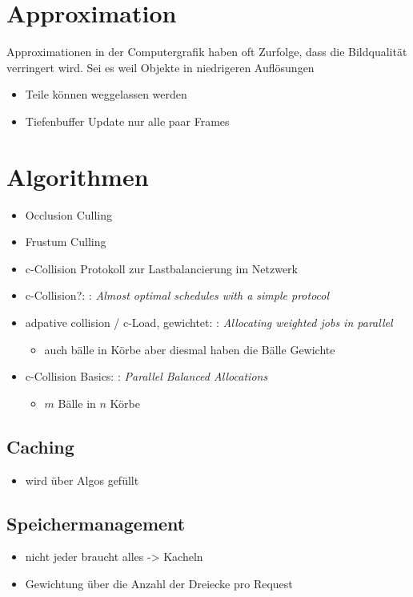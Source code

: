 \section{Approximation}
\label{basics:approximation}
Approximationen in der Computergrafik haben oft  Zurfolge, dass die Bildqualität verringert wird. Sei es weil Objekte in niedrigeren Auflösungen
\begin{itemize}
 \item Teile können weggelassen werden
 \item Tiefenbuffer Update nur alle paar Frames
\end{itemize}

\section{Algorithmen}
\label{basics:algorithmen}
\begin{itemize}
 \item Occlusion Culling \cite{RTR3}
 \item Frustum Culling \cite{RTR3}
 \item c-Collision Protokoll zur Lastbalancierung im Netzwerk
 \item c-Collision?: \cite{DBLP:conf/arcs/RehbergS99}: \textit{Almost optimal schedules with a simple protocol}
 \item adpative collision / c-Load, gewichtet: \cite{ccol2}: \textit{Allocating weighted jobs in parallel}
 \begin{itemize}
  \item auch bälle in Körbe aber diesmal haben die Bälle Gewichte
 \end{itemize}

 \item c-Collision Basics: \cite{ccol3}: \textit{Parallel Balanced Allocations}
 \begin{itemize}
  \item $m$ Bälle in $n$ Körbe
 \end{itemize}
\end{itemize}

\subsection{Caching}
\label{basics:caching}
\begin{itemize}
 \item wird über Algos gefüllt
\end{itemize}

\subsection{Speichermanagement}
\label{basics:speichermanagement}
\begin{itemize}
 \item nicht jeder braucht alles -> Kacheln
 \item Gewichtung über die Anzahl der Dreiecke pro Request
\end{itemize}
